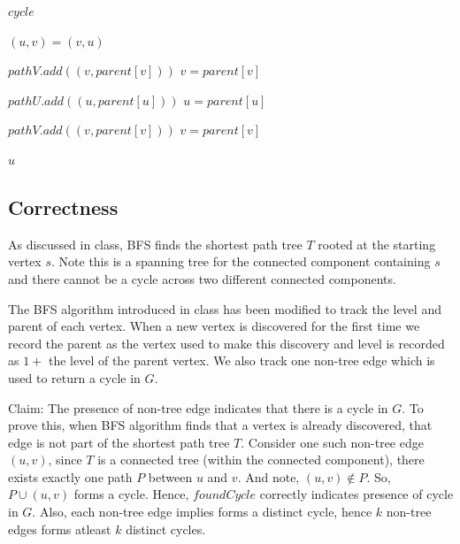 \documentclass{article}
\begin{document}
\begin{algorithm}[H]
\begin{algorithmic}
                    \State \Return $cycle$
                \EndProcedure

                        \State $(u,v) = (v,u)$
                    \EndIf

                        \State $pathV.add((v, parent[v]))$
                        \State $v = parent[v]$
                    \EndWhile

                        \State $pathU.add((u, parent[u]))$
                        \State $u = parent[u]$

                        \State $pathV.add((v, parent[v]))$
                        \State $v = parent[v]$
                    \EndWhile

                    \State \Return $u$
                \EndProcedure
            \end{algorithmic}
        \end{algorithm}

    \subsection*{Correctness}
    As discussed in class, BFS finds the shortest path tree $T$ rooted at the starting vertex $s$. Note this is a spanning tree for the connected component containing $s$ and there cannot be a cycle across two different connected components.

    The BFS algorithm introduced in class has been modified to track the level and parent of each vertex. When a new vertex is discovered for the first time we record the parent as the vertex used to make this discovery and level is recorded as $1+$ the level of the parent vertex. We also track one non-tree edge which is used to return a cycle in $G$.

    Claim: The presence of non-tree edge indicates that there is a cycle in $G$. To prove this, when BFS algorithm finds that a vertex is already discovered, that edge is not part of the shortest path tree $T$. Consider one such non-tree edge $(u, v)$, since $T$ is a connected tree (within the connected component), there exists exactly one path $P$ between $u$ and $v$. And note, $(u, v) \notin P$. So, $P \cup (u, v)$ forms a cycle. Hence, $foundCycle$ correctly indicates presence of cycle in $G$. Also, each non-tree edge implies forms a distinct cycle, hence $k$ non-tree edges forms atleast $k$ distinct cycles.
\end{document}
